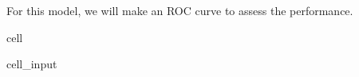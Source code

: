 \documentclass[letterpaper,10pt,english]{jupyterBook}
\begin{document}
\sphinxAtStartPar
For this model, we will make an ROC curve to assess the performance.

\begin{sphinxuseclass}{cell}\begin{sphinxVerbatimInput}

\begin{sphinxuseclass}{cell_input}
\begin{sphinxVerbatim}[commandchars=\\\{\}]
    
\end{sphinxVerbatim}

\end{sphinxuseclass}\end{sphinxVerbatimInput}

\end{sphinxuseclass}
\end{document}
